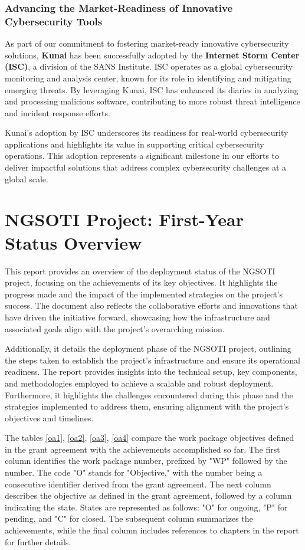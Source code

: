 \subsection*{Advancing the Market-Readiness of Innovative Cybersecurity Tools}

As part of our commitment to fostering market-ready innovative cybersecurity 
solutions, \textbf{Kunai} has been successfully adopted by the
\textbf{Internet Storm Center (ISC)}\cite{kunai_isc_sans}, a division of the
SANS Institute. ISC operates as a global cybersecurity monitoring and analysis
center, known for its role in identifying and mitigating emerging threats.
By leveraging Kunai, ISC has enhanced its diaries in analyzing and
processing malicious software, contributing to more robust threat intelligence
and incident response efforts.

Kunai's adoption by ISC underscores its readiness for real-world
cybersecurity applications and highlights its value in supporting critical
cybersecurity operations. This adoption represents a significant milestone in
our efforts to deliver impactful solutions that address complex cybersecurity
challenges at a global scale.

\chapter{NGSOTI Project: First-Year Status Overview}

This report provides an overview of the deployment status of the NGSOTI project,
focusing on the achievements of its key objectives. It highlights the progress
made and the impact of the implemented strategies on the project's success.
The document also reflects the collaborative efforts and innovations that have
driven the initiative forward, showcasing how the infrastructure and associated
goals align with the project's overarching mission.

Additionally, it details the deployment phase of the NGSOTI project, outlining
the steps taken to establish the project's infrastructure and ensure its
operational readiness. The report provides insights into the technical setup,
key components, and methodologies employed to achieve a scalable and robust
deployment. Furthermore, it highlights the challenges encountered during this
phase and the strategies implemented to address them, ensuring alignment with
the project's objectives and timelines.

The tables \ref{oa1}, \ref{oa2}, \ref{oa3}, \ref{oa4} compare the work package
objectives defined in the grant agreement with the achievements accomplished
so far. The first column identifies the work package number, prefixed by "WP"
followed by the number. The code "O" stands for "Objective," with the number
being a consecutive identifier derived from the grant agreement.
The next column describes the objective as defined in the grant agreement,
followed by a column indicating the state. States are represented as
follows: "O" for ongoing, "P" for pending, and "C" for closed. The subsequent
column summarizes the achievements, while the final column includes references
to chapters in the report for further details.

